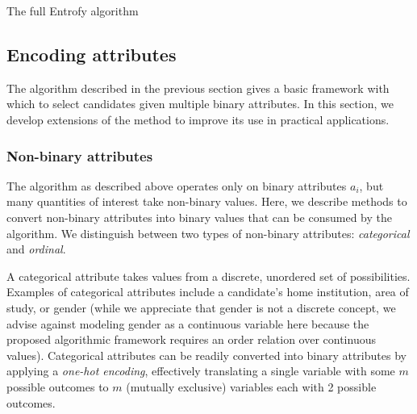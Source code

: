 \documentclass[10pt,letterpaper]{article}
\begin{document}
\begin{algorithm}[H]
\caption{The full Entrofy algorithm}\label{alg:entrofy}
\begin{algorithmic}[1]
\EndWhile{}
\EndProcedure{}
\Statex{}
\EndFor{}
\EndProcedure{}
\end{algorithmic}
\end{algorithm}

\subsection*{Encoding attributes}
The algorithm described in the previous section gives a basic framework with which to select candidates given multiple binary attributes.  In this section, we develop extensions of the method to improve its use in practical applications.

\subsubsection*{Non-binary attributes}
The algorithm as described above operates only on binary attributes $a_i$, but many quantities of interest take non-binary values.  Here, we describe methods to convert non-binary attributes into binary values that can be consumed by the algorithm.
We distinguish between two types of non-binary attributes: \emph{categorical} and \emph{ordinal}.

A categorical attribute takes values from a discrete, unordered set of possibilities.
Examples of categorical attributes include a candidate's home institution, area of study, or gender (while we appreciate that gender is not a discrete concept, we advise against modeling gender as a continuous variable here because the proposed algorithmic framework requires an order relation over continuous values).
Categorical attributes can be readily converted into binary attributes by applying a \emph{one-hot encoding}, effectively translating a single variable with some $m$ possible outcomes to $m$ (mutually exclusive) variables each with 2 possible outcomes.
\end{document}
